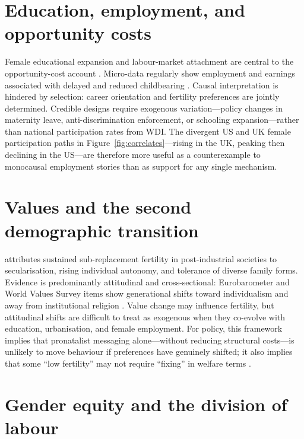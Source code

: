 \documentclass[11pt,a4paper,openany]{book}
\begin{document}
\section{Education, employment, and opportunity costs}

Female educational expansion and labour-market attachment are central to the opportunity-cost account \citep{rindfuss1996}. Micro-data regularly show employment and earnings associated with delayed and reduced childbearing \citep{adsera2011}. Causal interpretation is hindered by selection: career orientation and fertility preferences are jointly determined. Credible designs require exogenous variation---policy changes in maternity leave, anti-discrimination enforcement, or schooling expansion---rather than national participation rates from WDI. The divergent US and UK female participation paths in Figure~\ref{fig:correlates}---rising in the UK, peaking then declining in the US---are therefore more useful as a counterexample to monocausal employment stories than as support for any single mechanism.

\section{Values and the second demographic transition}

\citet{lesthaeghe2010} attributes sustained sub-replacement fertility in post-industrial societies to secularisation, rising individual autonomy, and tolerance of diverse family forms. Evidence is predominantly attitudinal and cross-sectional: Eurobarometer and World Values Survey items show generational shifts toward individualism and away from institutional religion \citep{lesthaeghe2010}. Value change may influence fertility, but attitudinal shifts are difficult to treat as exogenous when they co-evolve with education, urbanisation, and female employment. For policy, this framework implies that pronatalist messaging alone---without reducing structural costs---is unlikely to move behaviour if preferences have genuinely shifted; it also implies that some ``low fertility'' may not require ``fixing'' in welfare terms \citep{morgan2003}.

\section{Gender equity and the division of labour}
\end{document}
